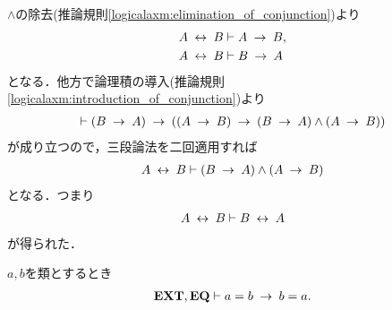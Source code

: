 	\begin{prf}
		$\wedge$の除去(推論規則\ref{logicalaxm:elimination_of_conjunction})より
		\begin{align}
			A \lrarrow B &\vdash A \rarrow B, \\
			A \lrarrow B &\vdash B \rarrow A
		\end{align}
		となる．他方で論理積の導入(推論規則\ref{logicalaxm:introduction_of_conjunction})より
		\begin{align}
			\vdash (B \rarrow A) \rarrow ((A \rarrow B) \rarrow 
			(B \rarrow A) \wedge (A \rarrow B))
		\end{align}
		が成り立つので，三段論法を二回適用すれば
		\begin{align}
			A \lrarrow B \vdash (B \rarrow A) \wedge (A \rarrow B)
		\end{align}
		となる．つまり
		\begin{align}
			A \lrarrow B \vdash B \lrarrow A
		\end{align}
		が得られた．
		\QED
	\end{prf}
	
	\begin{screen}
		\begin{thm}[等号の対称律]
		\label{thm:symmetry_of_equality}
			$a,b$を類とするとき
			\begin{align}
				\EXTAX,\EQAX \vdash a = b \rarrow b = a.
			\end{align}
		\end{thm}
	\end{screen}
	
